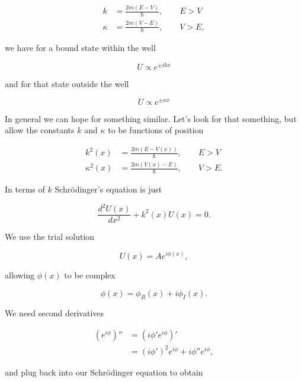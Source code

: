 \begin{align}\label{eqn:qmTwoL12:90}
k &= \frac{2m (E - V)}{\hbar},\qquad E > V \\
\kappa &= \frac{2m (V - E)}{\hbar}, \qquad V > E,
\end{align}

we have for a bound state within the well

\begin{equation}\label{eqn:qmTwoL12:50}
U \propto e^{\pm i k x}
\end{equation}

and for that state outside the well

\begin{equation}\label{eqn:qmTwoL12:70}
U \propto e^{\pm \kappa x}
\end{equation}

In general we can hope for something similar.  Let's look for that something, but allow the constants $k$ and $\kappa$ to be functions of position

\begin{align}\label{eqn:qmTwoL12:110}
k^2(x) &= \frac{2m (E - V(x))}{\hbar},\qquad E > V \\
\kappa^2(x) &= \frac{2m (V(x) - E)}{\hbar}, \qquad V > E.
\end{align}

In terms of $k$ Schr\"{o}dinger's equation is just

\begin{equation}\label{eqn:qmTwoL12:130}
\frac{d^2 U(x)}{dx^2} + k^2(x) U(x) = 0.
\end{equation}

We use the trial solution 

\begin{equation}\label{eqn:qmTwoL12:150}
U(x) = A e^{i \phi(x)},
\end{equation}

allowing $\phi(x)$ to be complex

\begin{equation}\label{eqn:qmTwoL12:170}
\phi(x) = \phi_R(x) + i \phi_I(x).
\end{equation}

We need second derivatives

\begin{align*}
(e^{i \phi})'' 
&=
(i \phi' e^{i \phi})'  \\
&=
(i \phi')^2 e^{i \phi} + i \phi'' e^{i \phi},
\end{align*}

and plug back into our Schr\"{o}dinger equation to obtain

